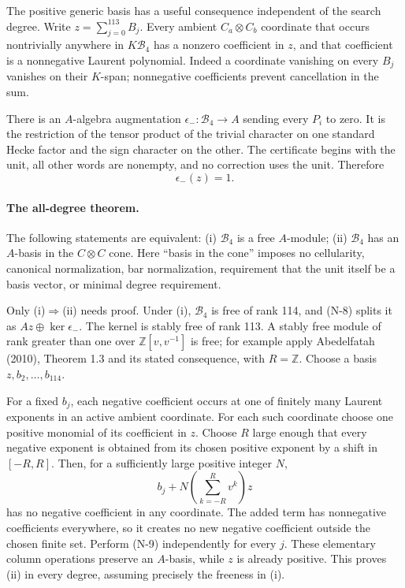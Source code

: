 The positive generic basis has a useful consequence independent of the
search degree.  Write $z=\sum_{j=0}^{113}B_j$.  Every ambient
$C_a\otimes C_b$ coordinate that occurs nontrivially anywhere in
$K\mathcal B_4$ has a nonzero coefficient in $z$, and that coefficient
is a nonnegative Laurent polynomial.  Indeed a coordinate vanishing
on every $B_j$ vanishes on their $K$-span; nonnegative coefficients
prevent cancellation in the sum.

There is an $A$-algebra augmentation
$\epsilon_-:\mathcal B_4\longrightarrow A$ sending every $P_i$ to
zero.  It is the restriction of the tensor product of the trivial
character on one standard Hecke factor and the sign character on the
other.  The certificate begins with the unit, all other words are
nonempty, and no correction uses the unit.  Therefore
\[
                              \epsilon_-(z)=1.
 \tag{N-8}
\]

\paragraph{The all-degree theorem.}
The following statements are equivalent:
(i) $\mathcal B_4$ is a free $A$-module;
(ii) $\mathcal B_4$ has an $A$-basis in the $C\otimes C$ cone.
Here ``basis in the cone'' imposes no cellularity, canonical normalization, bar normalization, requirement that the unit itself be a basis vector, or minimal degree requirement.

Only (i)$\Rightarrow$(ii) needs proof.  Under (i), $\mathcal B_4$ is
free of rank 114, and (N-8) splits it as
$Az\oplus\ker\epsilon_-$.  The kernel is stably free of rank 113.
A stably free module of rank greater than one over
$\mathbb Z[v,v^{-1}]$ is free; for example apply Abedelfatah (2010),
Theorem 1.3 and its stated consequence, with $R=\mathbb Z$.
Choose a basis $z,b_2,\ldots,b_{114}$.

For a fixed $b_j$, each negative coefficient occurs at one of finitely
many Laurent exponents in an active ambient coordinate.  For each
such coordinate choose one positive monomial of its coefficient in
$z$.  Choose $R$ large enough that every negative exponent is obtained
from its chosen positive exponent by a shift in $[-R,R]$.
Then, for a sufficiently large positive integer $N$,
\[
 b_j+N\left(\sum_{k=-R}^R v^k\right)z
 \tag{N-9}
\]
has no negative coefficient in any coordinate.  The added term has
nonnegative coefficients everywhere, so it creates no new negative
coefficient outside the chosen finite set.  Perform (N-9) independently
for every $j$.  These elementary column operations preserve an
$A$-basis, while $z$ is already positive.  This proves (ii) in every
degree, assuming precisely the freeness in (i).


